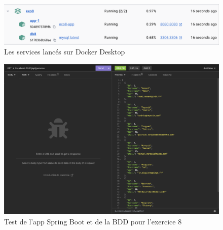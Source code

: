 \begin{figure}[hbtp]
    \centering
    \includegraphics[width=\textwidth]{images/exo8_desktop.png}
    \caption{Les services lancés sur Docker Desktop}
    \label{fig:exo8_services}
\end{figure}

\begin{figure}[hbtp]
    \centering
    \includegraphics[width=\textwidth]{images/exo8_api.png}
    \caption{Test de l'app Spring Boot et de la BDD pour l'exercice 8}
    \label{fig:exo8_api}
\end{figure}

